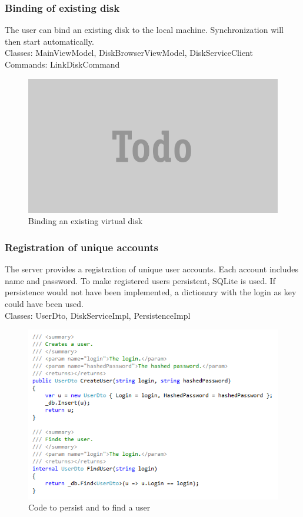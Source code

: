 \documentclass[JCDReport.tex]{subfiles}
\begin{document}
\subsubsection{Binding of existing disk}
The user can bind an existing disk to the local machine. Synchronization will then start automatically.\\
Classes: MainViewModel, DiskBrowserViewModel, DiskServiceClient\\
Commands: LinkDiskCommand
\begin{figure}[h!]
	\centering
	\includegraphics[scale=1]{Images/todo.png} 
	\caption{Binding an existing virtual disk}
\end{figure}	

\subsubsection{Registration of unique accounts}
The server provides a registration of unique user accounts. Each account includes name and password. To make registered users persistent, SQLite is used. If persistence would not have been implemented, a dictionary with the login as key could have been used.\\
Classes: UserDto, DiskServiceImpl, PersistenceImpl
\begin{figure}[h!]
	\centering
	\includegraphics[scale=1]{Images/login_server.png} 
	\caption{Code to persist and to find a user}
\end{figure}
\end{document}
